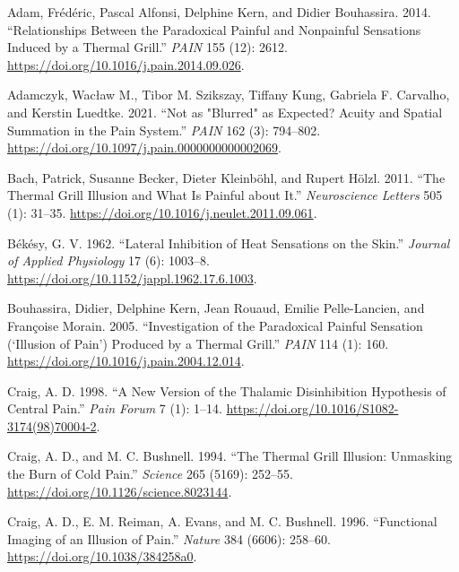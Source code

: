 \documentclass[
]{article}
\newlength{\cslhangindent}
\newlength{\cslentryspacingunit} %
\newenvironment{CSLReferences}[2] %
 {%
  \setlength{\parindent}{0pt}
  \ifodd #1
  \let\oldpar\par
  \def\par{\hangindent=\cslhangindent\oldpar}
  \fi
  \setlength{\parskip}{#2\cslentryspacingunit}
 }%
 {}
\begin{document}
\hypertarget{refs}{}
\begin{CSLReferences}{1}{0}
\leavevmode{}%
Adam, Frédéric, Pascal Alfonsi, Delphine Kern, and Didier Bouhassira.
2014. {``Relationships Between the Paradoxical Painful and Nonpainful
Sensations Induced by a Thermal Grill.''} \emph{PAIN} 155 (12): 2612.
\url{https://doi.org/10.1016/j.pain.2014.09.026}.

\leavevmode{}%
Adamczyk, Wacław M., Tibor M. Szikszay, Tiffany Kung, Gabriela F.
Carvalho, and Kerstin Luedtke. 2021. {``Not as "Blurred" as Expected?
{Acuity} and Spatial Summation in the Pain System.''} \emph{PAIN} 162
(3): 794--802. \url{https://doi.org/10.1097/j.pain.0000000000002069}.

\leavevmode{}%
Bach, Patrick, Susanne Becker, Dieter Kleinböhl, and Rupert Hölzl. 2011.
{``The Thermal Grill Illusion and What Is Painful about It.''}
\emph{Neuroscience Letters} 505 (1): 31--35.
\url{https://doi.org/10.1016/j.neulet.2011.09.061}.

\leavevmode{}%
Békésy, G. V. 1962. {``Lateral Inhibition of Heat Sensations on the
Skin.''} \emph{Journal of Applied Physiology} 17 (6): 1003--8.
\url{https://doi.org/10.1152/jappl.1962.17.6.1003}.

\leavevmode{}%
Bouhassira, Didier, Delphine Kern, Jean Rouaud, Emilie Pelle-Lancien,
and Françoise Morain. 2005. {``Investigation of the Paradoxical Painful
Sensation ({`Illusion of Pain'}) Produced by a Thermal Grill.''}
\emph{PAIN} 114 (1): 160.
\url{https://doi.org/10.1016/j.pain.2004.12.014}.

\leavevmode{}%
Craig, A. D. 1998. {``A New Version of the Thalamic Disinhibition
Hypothesis of Central Pain.''} \emph{Pain Forum} 7 (1): 1--14.
\url{https://doi.org/10.1016/S1082-3174(98)70004-2}.

\leavevmode{}%
Craig, A. D., and M. C. Bushnell. 1994. {``The Thermal Grill Illusion:
Unmasking the Burn of Cold Pain.''} \emph{Science} 265 (5169): 252--55.
\url{https://doi.org/10.1126/science.8023144}.

\leavevmode{}%
Craig, A. D., E. M. Reiman, A. Evans, and M. C. Bushnell. 1996.
{``Functional Imaging of an Illusion of Pain.''} \emph{Nature} 384
(6606): 258--60. \url{https://doi.org/10.1038/384258a0}.


\end{CSLReferences}
\end{document}

